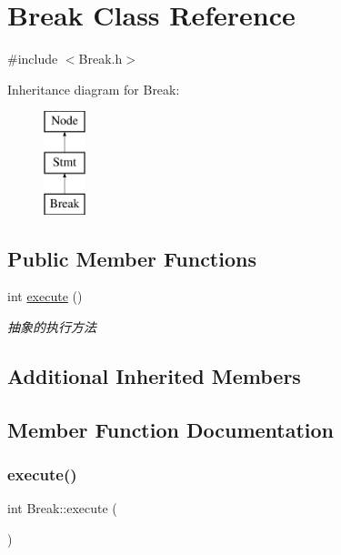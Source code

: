 \hypertarget{class_break}{}\section{Break Class Reference}
\label{class_break}


{\ttfamily \#include $<$Break.\+h$>$}

Inheritance diagram for Break\+:\begin{figure}[H]
\begin{center}
\leavevmode
\includegraphics[height=3.000000cm]{class_break}
\end{center}
\end{figure}
\subsection*{Public Member Functions}
\begin{DoxyCompactItemize}
\item 
int \hyperlink{class_break_a554fd4cae05d203145d62868f73004d4}{execute} ()
\begin{DoxyCompactList}\small\item\em 抽象的执行方法 \end{DoxyCompactList}\end{DoxyCompactItemize}
\subsection*{Additional Inherited Members}


\subsection{Member Function Documentation}
\mbox{\label{class_break_a554fd4cae05d203145d62868f73004d4}} 
\subsubsection{\texorpdfstring{execute()}{execute()}}
{\footnotesize\ttfamily int Break\+::execute (\begin{DoxyParamCaption}{ }\end{DoxyParamCaption})\hspace{0.3cm}{\ttfamily [virtual]}}



